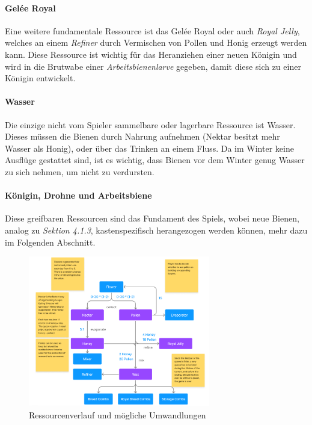 \paragraph{Gelée Royal}
Eine weitere fundamentale Ressource ist das Gelée Royal oder auch \textit{Royal Jelly}, welches an einem \textit{Refiner} durch Vermischen von Pollen und Honig erzeugt werden kann. Diese Ressource ist wichtig für das Heranziehen einer neuen Königin und wird in die Brutwabe einer \textit{Arbeitsbienenlarve} gegeben, damit diese sich zu einer Königin entwickelt.

\paragraph{Wasser}
Die einzige nicht vom Spieler sammelbare oder lagerbare Ressource ist Wasser. Dieses müssen die Bienen durch Nahrung aufnehmen (Nektar besitzt mehr Wasser als Honig), oder über das Trinken an einem Fluss. Da im Winter keine Ausflüge gestattet sind, ist es wichtig, dass Bienen vor dem Winter genug Wasser zu sich nehmen, um nicht zu verdursten.

\paragraph{Königin, Drohne und Arbeitsbiene}
Diese greifbaren Ressourcen sind das Fundament des Spiels, wobei neue Bienen, analog zu \textit{Sektion 4.1.3}, kastenspezifisch herangezogen werden können, mehr dazu im Folgenden Abschnitt.

\begin{figure}
    \begin{center}
        \includegraphics[width=300px]{0.bilder/resourceloop.png}
    \end{center}
    \caption{Ressourcenverlauf und mögliche Umwandlungen} \label{image:resourceloop}
\end{figure}

